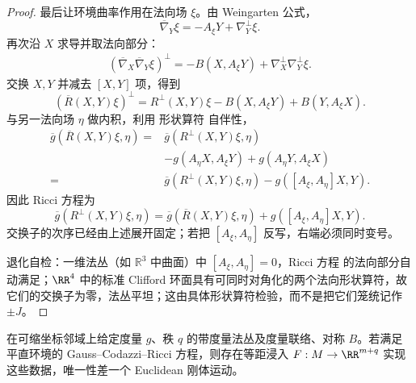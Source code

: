 \begin{proof}
最后让环境曲率作用在法向场 $\xi$。由 Weingarten 公式，
\[
\overline\nabla_Y\xi
=-A_\xi Y+\nabla_Y^\perp\xi.
\]
再次沿 $X$ 求导并取法向部分：
\[
\begin{aligned}
(\overline\nabla_X\overline\nabla_Y\xi)^\perp
=-B(X,A_\xi Y)
+\nabla_X^\perp\nabla_Y^\perp\xi.
\end{aligned}
\]
交换 $X,Y$ 并减去 $[X,Y]$ 项，得到
\[
(\overline R(X,Y)\xi)^\perp
=R^\perp(X,Y)\xi
-B(X,A_\xi Y)+B(Y,A_\xi X).
\]
与另一法向场 $\eta$ 做内积，利用 形状算符 自伴性，
\[
\begin{aligned}
\overline g(\overline R(X,Y)\xi,\eta)
={}&\overline g(R^\perp(X,Y)\xi,\eta)\\
&-g(A_\eta X,A_\xi Y)
+g(A_\eta Y,A_\xi X)\\
={}&\overline g(R^\perp(X,Y)\xi,\eta)
-g([A_\xi,A_\eta]X,Y).
\end{aligned}
\]
因此 Ricci 方程为
\begin{equation}\label{eq:math-dg-ricci-general}
\boxed{
\overline g(R^\perp(X,Y)\xi,\eta)
=\overline g(\overline R(X,Y)\xi,\eta)
+g([A_\xi,A_\eta]X,Y).}
\end{equation}
交换子的次序已经由上述展开固定；若把 $[A_\xi,A_\eta]$ 反写，右端必须同时变号。

退化自检：一维法丛（如 $\mathbb R^3$ 中曲面）中 $[A_\xi,A_\eta]=0$，Ricci 方程 的法向部分自动满足；$\RR^4$ 中的标准 Clifford 环面具有可同时对角化的两个法向形状算符，故它们的交换子为零，法丛平坦；这由具体形状算符检验，而不是把它们笼统记作 $\pm J$。
\end{proof}

\begin{theorem}
在可缩坐标邻域上给定度量 $g$、秩 $q$ 的带度量法丛及度量联络、对称 $B$。若满足平直环境的 Gauss--Codazzi--Ricci 方程，则存在等距浸入 $F:M\to\RR^{m+q}$ 实现这些数据，唯一性差一个 Euclidean 刚体运动。
\end{theorem}

